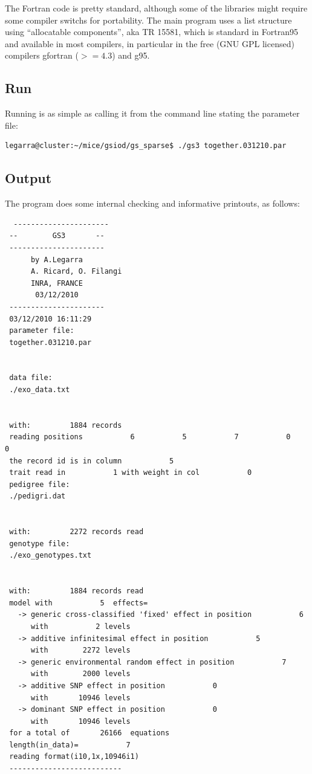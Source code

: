 \documentclass[a4paper,12pt,titlepage]{article}      %
\begin{document}
The Fortran code is pretty standard, although some of the libraries might require some compiler switchs for portability. The main program uses a list structure using ``allocatable components'', aka TR 15581, which is standard in Fortran95 and available in most compilers, in particular in the free (GNU GPL licensed) compilers gfortran ($>=4.3$) and g95. 



\subsection{Run}

Running is as simple as calling it from the command line stating the parameter file:
\begin{verbatim}
legarra@cluster:~/mice/gsiod/gs_sparse$ ./gs3 together.031210.par
\end{verbatim}

\subsection{Output}
The program does some internal checking and informative printouts, as follows:

{\scriptsize
\begin{verbatim}
  ----------------------
 --        GS3       --
 ----------------------
      by A.Legarra
      A. Ricard, O. Filangi
      INRA, FRANCE
       03/12/2010
 ----------------------
 03/12/2010 16:11:29
 parameter file:
 together.031210.par


 data file:
 ./exo_data.txt


 with:         1884 records
 reading positions           6           5           7           0           0
 the record id is in column           5
 trait read in           1 with weight in col           0
 pedigree file:
 ./pedigri.dat


 with:         2272 records read
 genotype file:
 ./exo_genotypes.txt


 with:         1884 records read
 model with           5  effects=
   -> generic cross-classified 'fixed' effect in position           6
      with           2 levels
   -> additive infinitesimal effect in position           5
      with        2272 levels
   -> generic environmental random effect in position           7
      with        2000 levels
   -> additive SNP effect in position           0
      with       10946 levels
   -> dominant SNP effect in position           0
      with       10946 levels
 for a total of       26166  equations
 length(in_data)=           7
 reading format(i10,1x,10946i1)
 --------------------------
 \end{verbatim}
}
\end{document}
